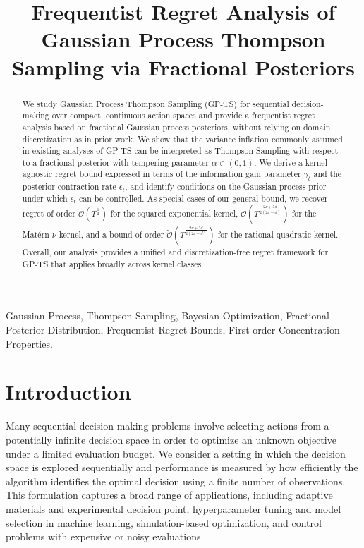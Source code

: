 \documentclass[final,12pt]{colt2026} %
\title[Frequentist Regret Analysis of GP-TS via Fractional Posteriors]{Frequentist Regret Analysis of Gaussian Process Thompson Sampling via Fractional Posteriors}
\begin{document}
\maketitle

\begin{abstract}
We study Gaussian Process Thompson Sampling (GP-TS) for sequential decision-making over compact, continuous action spaces and provide a frequentist regret analysis based on fractional Gaussian process posteriors, without relying on domain discretization as in prior work. We show that the variance inflation commonly assumed in existing analyses of GP-TS can be interpreted as Thompson Sampling with respect to a fractional posterior with tempering parameter $\alpha \in (0,1)$. We derive a kernel-agnostic regret bound expressed in terms of the information gain parameter $\gamma_t$ and the posterior contraction rate $\epsilon_t$, and identify conditions on the Gaussian process prior under which $\epsilon_t$ can be controlled. As special cases of our general bound, we recover regret of order $\mathcal{\tilde O}(T^{\frac{1}{2}})$ for the squared exponential kernel, $\mathcal{\tilde O}(T^{\frac{2\nu+3d}{2(2\nu+d)}} )$ for the Mat\'ern-$\nu$ kernel, and a bound of order $\tilde{\mathcal O}(T^{\frac{2\nu+3d}{2(2\nu+d)}})$ for the rational quadratic kernel. Overall, our analysis provides a unified and discretization-free regret framework for GP-TS that applies broadly across kernel classes.
\end{abstract}

\begin{keywords}%
Gaussian Process, Thompson Sampling, Bayesian Optimization, Fractional Posterior Distribution, Frequentist Regret Bounds, First-order Concentration Properties.
\end{keywords}

\section{Introduction}\label{sec:introduction}

Many sequential decision-making problems involve selecting actions from a potentially infinite decision space in order to optimize an unknown objective under a limited evaluation budget. We consider a setting in which the decision space is explored sequentially and performance is measured by how efficiently the algorithm identifies the optimal decision using a finite number of observations. This formulation captures a broad range of applications, including adaptive materials and experimental decision point, hyperparameter tuning and model selection in machine learning, simulation-based optimization, and control problems with expensive or noisy evaluations~\citep{frazier2018bayesian,Lei2021}.
\end{document}
